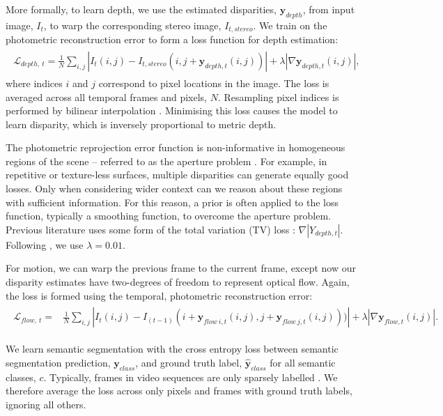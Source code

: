 More formally, to learn depth, we use the estimated disparities, $\mathbf{y}_{depth}$, from input image, $I_t$, to warp the corresponding stereo image, $I_{t,stereo}$. We train on the photometric reconstruction error to form a loss function for depth estimation:
\begin{align}
\begin{split}
\mathcal{L}_{depth,~t} = \frac{1}{N} \sum_{i,j} | I_t(i,j) - I_{t,stereo}(i,j+\mathbf{y}_{depth,t}(i,j)) |  + \lambda | \nabla \mathbf{y}_{depth,t}(i,j) |,
\end{split}
\label{eqn:depth}
\end{align}
where indices $i$ and $j$ correspond to pixel locations in the image. The loss is averaged across all temporal frames and pixels, $N$. Resampling pixel indices is performed by bilinear interpolation \citep{jaderberg2015spatial}. Minimising this loss causes the model to learn disparity, which is inversely proportional to metric depth.

The photometric reprojection error function is non-informative in homogeneous regions of the scene -- referred to as the aperture problem \citep{hartley2000}. For example, in repetitive or texture-less surfaces, multiple disparities can generate equally good losses. Only when considering wider context can we reason about these regions with sufficient information. For this reason, a prior is often applied to the loss function, typically a smoothing function, to overcome the aperture problem. Previous literature \citep{garg2016unsupervised} uses some form of the total variation (TV) loss \citep{rudin1992nonlinear}: $\nabla | Y_{depth,t} |$. Following \citep{garg2016unsupervised}, we use $\lambda = 0.01$.

For motion, we can warp the previous frame to the current frame, except now our disparity estimates have two-degrees of freedom to represent optical flow. Again, the loss is formed using the temporal, photometric reconstruction error:
\begin{align}
\begin{split}
\mathcal{L}_{flow,~t} =& \frac{1}{N} \sum_{i,j} | I_t(i,j)
- I_{(t-1)}(i+\mathbf{y}_{flow~i,t}(i,j),j+\mathbf{y}_{flow~j,t}(i,j))) |
+ \lambda | \nabla \mathbf{y}_{flow,t}(i,j) |.
\label{eqn:flow}
\end{split}
\end{align}

We learn semantic segmentation with the cross entropy loss between semantic segmentation prediction, $\mathbf{y}_{class}$, and ground truth label, $\mathbf{\hat{y}}_{class}$ for all semantic classes, $c$.
Typically, frames in video sequences are only sparsely labelled \citep{Cordts2016Cityscapes}. We therefore average the loss across only pixels and frames with ground truth labels, ignoring all others.

